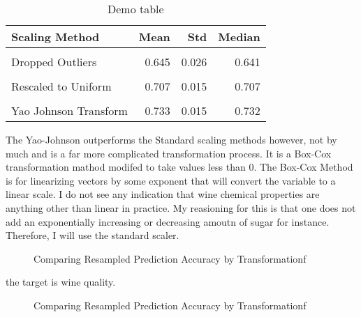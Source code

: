\documentclass[16pt,twocolumn,letterpaper,titlepage]{article}
\begin{document}
\begin{table}[!h]

\caption{Demo table}
\centering
\begin{tabular}[t]{lrrr}
\toprule
Scaling Method & Mean & Std & Median\\
\midrule
\cellcolor{gray!6}{No Transformation} & \cellcolor{gray!6}{0.590} & \cellcolor{gray!6}{0.024} & \cellcolor{gray!6}{0.592}\\
Dropped Outliers & 0.645 & 0.026 & 0.641\\
\cellcolor{gray!6}{Min Max Scale} & \cellcolor{gray!6}{0.690} & \cellcolor{gray!6}{0.018} & \cellcolor{gray!6}{0.691}\\
Rescaled to Uniform & 0.707 & 0.015 & 0.707\\
\cellcolor{gray!6}{Standard Scale} & \cellcolor{gray!6}{0.726} & \cellcolor{gray!6}{0.017} & \cellcolor{gray!6}{0.725}\\
\addlinespace
Yao Johnson Transform & 0.733 & 0.015 & 0.732\\
\bottomrule
\end{tabular}
\end{table}

The Yao-Johnson outperforms the Standard scaling methods however, not by much and is a far more complicated transformation process. It is a Box-Cox transformation mathod modifed to take values less than 0. The Box-Cox Method is for linearizing vectors by some exponent that will convert the variable to a linear scale. I do not see any indication that wine chemical properties are anything other than linear in practice. My reasioning for this is that one does not add an exponentially increasing or decreasing amoutn of sugar for instance. Therefore, I will use the standard scaler.

\begin{figure}[!htb]
	\caption{\label{fig:my-label} Comparing Resampled Prediction Accuracy by Transformationf}
\end{figure}


the target is wine quality. 

\begin{figure}[!htb]
	\caption{\label{fig:my-label} Comparing Resampled Prediction Accuracy by Transformationf}
\end{figure}



\end{document}

